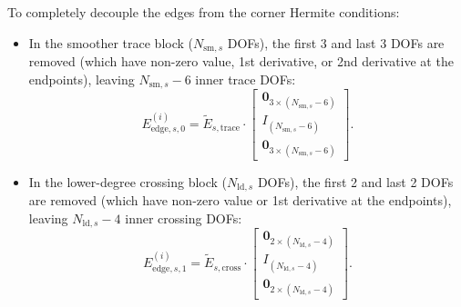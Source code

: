 \documentclass[11pt,a4paper]{article}
\newcommand{\mb}[1]{\mathbf{#1}}
\begin{document}
To completely decouple the edges from the corner Hermite conditions:
\begin{itemize}
    \item In the smoother trace block ($N_{\text{sm}, s}$ DOFs), the first 3 and last 3 DOFs are removed (which have non-zero value, 1st derivative, or 2nd derivative at the endpoints), leaving $N_{\text{sm}, s} - 6$ inner trace DOFs:
    \begin{equation}
        E_{\text{edge}, s, 0}^{(i)} = \widetilde{E}_{s, \text{trace}} \cdot \begin{bmatrix} \mb{0}_{3 \times (N_{\text{sm}, s}-6)} \\ I_{(N_{\text{sm}, s}-6)} \\ \mb{0}_{3 \times (N_{\text{sm}, s}-6)} \end{bmatrix}.
    \end{equation}
    \item In the lower-degree crossing block ($N_{\text{ld}, s}$ DOFs), the first 2 and last 2 DOFs are removed (which have non-zero value or 1st derivative at the endpoints), leaving $N_{\text{ld}, s} - 4$ inner crossing DOFs:
    \begin{equation}
        E_{\text{edge}, s, 1}^{(i)} = \widetilde{E}_{s, \text{cross}} \cdot \begin{bmatrix} \mb{0}_{2 \times (N_{\text{ld}, s}-4)} \\ I_{(N_{\text{ld}, s}-4)} \\ \mb{0}_{2 \times (N_{\text{ld}, s}-4)} \end{bmatrix}.
    \end{equation}
\end{itemize}
\end{document}
